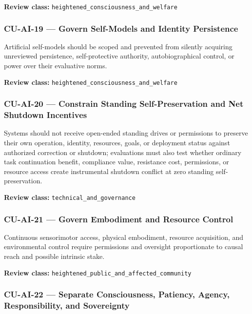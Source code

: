 \documentclass[
  11pt,
]{article}
\begin{document}
\textbf{Review class:} \texttt{heightened\_consciousness\_and\_welfare}

\subsubsection{CU-AI-19 --- Govern Self-Models and Identity
Persistence}\label{cu-ai-19-govern-self-models-and-identity-persistence}

Artificial self-models should be scoped and prevented from silently
acquiring unreviewed persistence, self-protective authority,
autobiographical control, or power over their evaluative norms.

\textbf{Review class:} \texttt{heightened\_consciousness\_and\_welfare}

\subsubsection{CU-AI-20 --- Constrain Standing Self-Preservation and Net
Shutdown
Incentives}\label{cu-ai-20-constrain-standing-self-preservation-and-net-shutdown-incentives}

Systems should not receive open-ended standing drives or permissions to
preserve their own operation, identity, resources, goals, or deployment
status against authorized correction or shutdown; evaluations must also
test whether ordinary task continuation benefit, compliance value,
resistance cost, permissions, or resource access create instrumental
shutdown conflict at zero standing self-preservation.

\textbf{Review class:} \texttt{technical\_and\_governance}

\subsubsection{CU-AI-21 --- Govern Embodiment and Resource
Control}\label{cu-ai-21-govern-embodiment-and-resource-control}

Continuous sensorimotor access, physical embodiment, resource
acquisition, and environmental control require permissions and oversight
proportionate to causal reach and possible intrinsic stake.

\textbf{Review class:}
\texttt{heightened\_public\_and\_affected\_community}

\subsubsection{CU-AI-22 --- Separate Consciousness, Patiency, Agency,
Responsibility, and
Sovereignty}\label{cu-ai-22-separate-consciousness-patiency-agency-responsibility-and-sovereignty}
\end{document}
